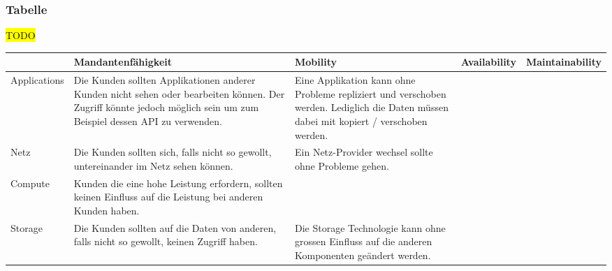 \documentclass[11pt,titlepage]{article}
\begin{document}
\begin{landscape}
\subsubsection{Tabelle}
\label{sec:Aufgabe-4_tabelle}
\colorbox{yellow}{TODO}

\begin{tabular}{ |p{2cm}|p{5cm}|p{5cm}|p{5cm}|p{5cm}|  }
  \hline
  & 
  Mandantenfähigkeit 
  & 
  Mobility 
  & 
  Availability
  & 
  Maintainability
  \\
  \hline
  Applications
  &
  Die Kunden sollten Applikationen anderer Kunden nicht sehen oder bearbeiten können.
  Der Zugriff könnte jedoch möglich sein um zum Beispiel dessen API zu verwenden.
  &
  Eine Applikation kann ohne Probleme repliziert und verschoben werden. Lediglich die Daten müssen dabei mit kopiert / verschoben werden. 
  &
  
  &
  \\
  Netz
  &
  Die Kunden sollten sich, falls nicht so gewollt, untereinander im Netz sehen können.
  &
  Ein Netz-Provider wechsel sollte ohne Probleme gehen.
  &
  
  &
  \\
  Compute
  &
  Kunden die eine hohe Leistung erfordern, sollten keinen Einfluss auf die Leistung bei anderen Kunden haben.
  &
  
  &
  
  &
  \\
  Storage &
  Die Kunden sollten auf die Daten von anderen, falls nicht so gewollt, keinen Zugriff haben.
  &
  Die Storage Technologie kann ohne grossen Einfluss auf die anderen Komponenten geändert werden.
  &
  &
  \\
  \hline
\end{tabular}
\end{landscape}
\end{document}
